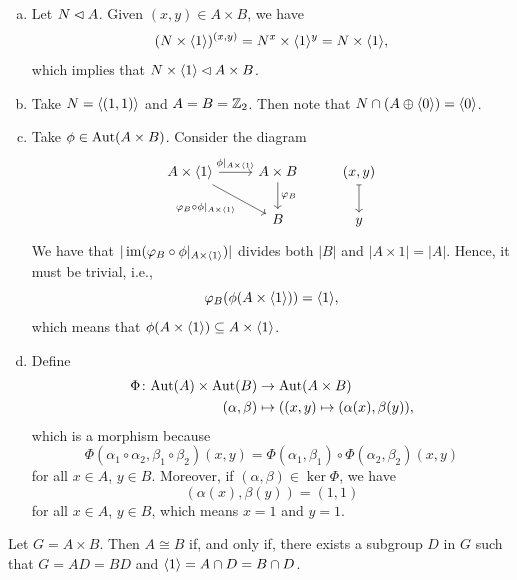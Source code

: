 \begin{solution}

\begin{enumerate}[a),font=\upshape]
    \item Let $N\lhd A$. Given $(x,y)\in A\times B$, we have
    $$
        (N\times\langle1\rangle)^{(x,y)}=N^x\times\langle1\rangle^y = N\times\langle1\rangle,
    $$
    which implies that $N\times\langle1\rangle\lhd A\times B$.

    \item Take $N=\langle(1,1)\rangle$ and $A=B=\mathbb{Z}_2$. Then note that $N\cap (A\oplus\langle0\rangle)=\langle0\rangle$.

    \item Take $\phi\in{\rm Aut}(A\times B)$. Consider the diagram
    $$
        \begin{tikzcd}
            A\times\gen1\arrow[r,"\phi|_{A\times\gen1}"]
                    \arrow[rd,"\varphi_B\circ\phi|_{A\times\gen1}"']
                &A\times B\arrow[d,"\varphi_B"]
                &(x,y)\arrow[d,mapsto]\\
                &B
                &y
        \end{tikzcd}
    $$
    We have that $|\operatorname{im}(\varphi_B\circ\phi|_{A\times\langle1\rangle})|$ divides both $|B|$ and\/ $|A\times1|=|A|$. Hence, it must be trivial, i.e.,
    $$
        \varphi_B(\phi(A\times\langle1\rangle))=\langle1\rangle,
    $$
    which means that $\phi(A\times\langle1\rangle)\subseteq A\times\langle1\rangle$.

    \item Define
    \begin{align*}
        \Phi\colon{\rm Aut}(A)\times{\rm Aut}(B)&\to{\rm Aut}(A\times B)\\
        (\alpha,\beta)&\mapsto((x,y)\mapsto(\alpha(x),\beta(y)),
    \end{align*}
    which is a morphism because
    $$
        \Phi(\alpha_1\circ\alpha_2,\beta_1\circ\beta_2)(x,y)
            = \Phi(\alpha_1,\beta_1)\circ\Phi(\alpha_2,\beta_2)(x,y)
    $$
    for all $x\in A$, $y\in B$. Moreover, if $(\alpha,\beta)\in\ker\Phi$, we have
    $$
        (\alpha(x),\beta(y))=(1,1)
    $$
    for all $x\in A$, $y\in B$, which means $x=1$ and $y=1$.
\end{enumerate}
\end{solution}

\begin{exr}\label{exercise-1.6.2}
    Let\/ $G=A\times B$. Then\/ $A\cong B$ if, and only if, there exists a subgroup\/ $D$ in\/ $G$ such that\/ $G=AD=BD$ and\/ $\langle1\rangle=A\cap D=B\cap D$.
\end{exr}

